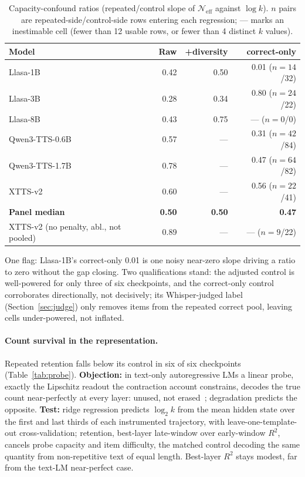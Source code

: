 \begin{table}[htbp]
\centering
\caption{Capacity-confound ratios (repeated/control slope of $\mathcal{N}_{\mathrm{eff}}$ against
$\log k$). $n$ pairs are repeated-side/control-side rows entering each regression; --- marks an
inestimable cell (fewer than 12 usable rows, or fewer than 4 distinct $k$ values).}
\label{tab:capconf}
\small
\begin{tabular}{@{}lrrr@{}}
\toprule
Model & Raw & +diversity & correct-only \\
\midrule
Llasa-1B & 0.42 & 0.50 & 0.01 ($n{=}14$/32) \\
Llasa-3B & 0.28 & 0.34 & 0.80 ($n{=}24$/22) \\
Llasa-8B & 0.43 & 0.75 & --- ($n{=}0$/0) \\
Qwen3-TTS-0.6B & 0.57 & --- & 0.31 ($n{=}42$/84) \\
Qwen3-TTS-1.7B & 0.78 & --- & 0.47 ($n{=}64$/82) \\
XTTS-v2 & 0.60 & --- & 0.56 ($n{=}22$/41) \\
\midrule
\textbf{Panel median} & \textbf{0.50} & \textbf{0.50} & \textbf{0.47} \\
XTTS-v2 (no penalty, abl., not pooled) & 0.89 & --- & --- ($n{=}9$/22) \\
\bottomrule
\end{tabular}
\end{table}

One flag: Llasa-1B's correct-only 0.01 is one noisy near-zero slope driving a ratio to zero
without the gap closing. Two qualifications stand: the adjusted control is well-powered for
only three of six checkpoints, and the correct-only control corroborates directionally, not
decisively; its Whisper-judged label (Section~\ref{sec:judge}) only removes items from the
repeated correct pool, leaving cells under-powered, not inflated.

\paragraph{Count survival in the representation.} Repeated retention falls below its control in
six of six checkpoints (Table~\ref{tab:probe}). \textbf{Objection:} in text-only autoregressive
LMs a linear probe, exactly the Lipschitz readout the contraction account constrains, decodes
the true count near-perfectly at every layer: unused, not
erased~\cite{venkatesh2026repeated}; degradation predicts the opposite. \textbf{Test:} ridge
regression predicts $\log_2 k$ from the mean hidden state over the first and last thirds of
each instrumented trajectory, with leave-one-template-out cross-validation; retention,
best-layer late-window over early-window $R^2$, cancels probe capacity and item difficulty,
the matched control decoding the same quantity from non-repetitive text of equal length.
Best-layer $R^2$ stays modest, far from the text-LM near-perfect case.

